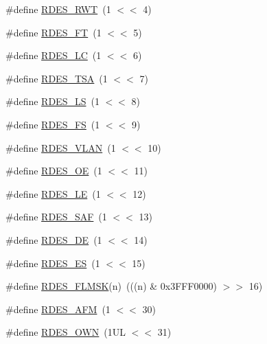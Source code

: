 \begin{DoxyCompactItemize}
\item 
\#define \hyperlink{group___e_n_e_t__18_x_x__43_x_x_gafe27618e74ba84b18858639f2c2bd871}{R\+D\+E\+S\+\_\+\+R\+WT}~(1 $<$$<$ 4)
\item 
\#define \hyperlink{group___e_n_e_t__18_x_x__43_x_x_gaf9e9ee25577290fd7f893facf188a3d2}{R\+D\+E\+S\+\_\+\+FT}~(1 $<$$<$ 5)
\item 
\#define \hyperlink{group___e_n_e_t__18_x_x__43_x_x_ga7116294fed05cad412f40f82fde70d59}{R\+D\+E\+S\+\_\+\+LC}~(1 $<$$<$ 6)
\item 
\#define \hyperlink{group___e_n_e_t__18_x_x__43_x_x_ga1cd507083e4d196ba5ee0cd89dee96ef}{R\+D\+E\+S\+\_\+\+T\+SA}~(1 $<$$<$ 7)
\item 
\#define \hyperlink{group___e_n_e_t__18_x_x__43_x_x_ga0e41f6970edd2445ecdf2476151453ff}{R\+D\+E\+S\+\_\+\+LS}~(1 $<$$<$ 8)
\item 
\#define \hyperlink{group___e_n_e_t__18_x_x__43_x_x_ga2ef5f52b66037bdddf8308513c2cf430}{R\+D\+E\+S\+\_\+\+FS}~(1 $<$$<$ 9)
\item 
\#define \hyperlink{group___e_n_e_t__18_x_x__43_x_x_gae11e38b24844220e348a8ea16c2a45d8}{R\+D\+E\+S\+\_\+\+V\+L\+AN}~(1 $<$$<$ 10)
\item 
\#define \hyperlink{group___e_n_e_t__18_x_x__43_x_x_ga0837f2aee9d6fc80cb34035312c9d734}{R\+D\+E\+S\+\_\+\+OE}~(1 $<$$<$ 11)
\item 
\#define \hyperlink{group___e_n_e_t__18_x_x__43_x_x_gaedc8331fd1ac3fe6ef81b4f6700da4f9}{R\+D\+E\+S\+\_\+\+LE}~(1 $<$$<$ 12)
\item 
\#define \hyperlink{group___e_n_e_t__18_x_x__43_x_x_ga607da9585ceb30bdedab8f61b682e2fc}{R\+D\+E\+S\+\_\+\+S\+AF}~(1 $<$$<$ 13)
\item 
\#define \hyperlink{group___e_n_e_t__18_x_x__43_x_x_gac2a67d21a84efd03163c6caf8679f590}{R\+D\+E\+S\+\_\+\+DE}~(1 $<$$<$ 14)
\item 
\#define \hyperlink{group___e_n_e_t__18_x_x__43_x_x_gab6e086048912f3db29de979e94bb714d}{R\+D\+E\+S\+\_\+\+ES}~(1 $<$$<$ 15)
\item 
\#define \hyperlink{group___e_n_e_t__18_x_x__43_x_x_gaf67a96be3264260aa3864af4f5a147be}{R\+D\+E\+S\+\_\+\+F\+L\+M\+SK}(n)~(((n) \& 0x3\+F\+F\+F0000) $>$$>$ 16)
\item 
\#define \hyperlink{group___e_n_e_t__18_x_x__43_x_x_ga59b10316c9fa9925fb7f02a3b68d7beb}{R\+D\+E\+S\+\_\+\+A\+FM}~(1 $<$$<$ 30)
\item 
\#define \hyperlink{group___e_n_e_t__18_x_x__43_x_x_ga5b26dbe398fa8d2220ea56614b70679e}{R\+D\+E\+S\+\_\+\+O\+WN}~(1\+U\+L $<$$<$ 31)
$$
\end{DoxyCompactItemize}
